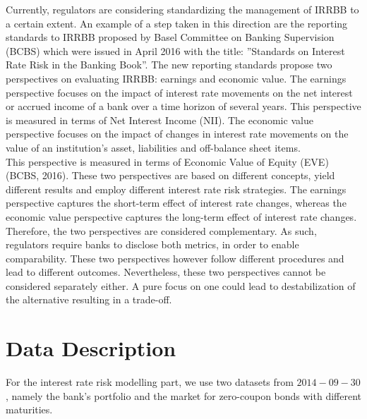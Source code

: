 \documentclass[11pt]{article}
\begin{document}
Currently, regulators are considering standardizing the management of IRRBB to a certain extent. An example of a step taken in this direction are the reporting standards
to IRRBB proposed by Basel Committee on Banking Supervision (BCBS) which were
issued in April 2016 with the title: ”Standards on Interest Rate Risk in the Banking
Book”. The new reporting standards propose two perspectives on evaluating IRRBB:
earnings and economic value. The earnings perspective focuses on the impact of interest rate movements on the net interest or accrued income of a bank over a time
horizon of several years. This perspective is measured in terms of Net Interest Income
(NII). The economic value perspective focuses on the impact of changes in interest rate
movements on the value of an institution’s asset, liabilities and off-balance sheet items.\\


This perspective is measured in terms of Economic Value of Equity (EVE) (BCBS,
2016). These two perspectives are based on different concepts, yield different results
and employ different interest rate risk strategies.
The earnings perspective captures the short-term effect of interest rate changes, whereas
the economic value perspective captures the long-term effect of interest rate changes.
Therefore, the two perspectives are considered complementary. As such, regulators
require banks to disclose both metrics, in order to enable comparability. These two
perspectives however follow different procedures and lead to different outcomes. Nevertheless, these two perspectives cannot be considered separately either. A pure focus on one could lead to destabilization of the alternative resulting in a trade-off.




\section{Data Description}

For the interest rate risk modelling part, we use two datasets from $2014-09-30$, namely the bank's portfolio and the market for zero-coupon bonds with different maturities.\\
\end{document}
